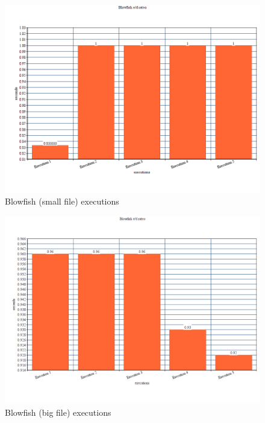 \documentclass{article}
\begin{document}
	\begin{figure}[h]
		\includegraphics[width=1\textwidth ]{images/Blowfish.png}
		\centering
		\caption{Blowfish (small file) executions}
	\end{figure}
	
	\begin{figure}[h]
		\includegraphics[width=1\textwidth ]{images/Blowfish(big).png}
		\centering
		\caption{Blowfish (big file) executions}
	\end{figure}
\end{document}
